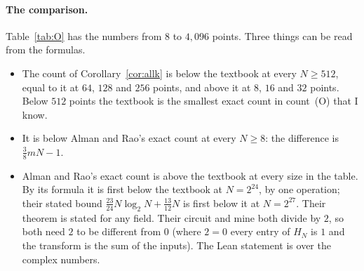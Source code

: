 \documentclass[10pt]{article}
\theoremstyle{remark}
\newcommand{\cntO}{\textup{(O)}}
\renewcommand{\lg}{\log_2}
\begin{document}
\paragraph{The comparison.}
Table~\ref{tab:O} has the numbers from $8$ to $4{,}096$ points. Three things can be read from the formulas.
\begin{itemize}\setlength{\itemsep}{1pt}\setlength{\parskip}{0pt}
\item The count of Corollary~\ref{cor:allk} is below the textbook at every $N\ge 512$, equal to it at
$64$, $128$ and $256$ points, and above it at $8$, $16$ and $32$ points. Below $512$ points the textbook is
the smallest exact count in count~\cntO{} that I know.
\item It is below Alman and Rao's exact count at every $N\ge 8$: the difference is $\tfrac38mN-1$.
\item Alman and Rao's exact count is above the textbook at every size in the table. By its formula it is
first below the textbook at $N=2^{24}$, by one operation; their stated bound
$\tfrac{23}{24}N\lg N+\tfrac{13}{12}N$ is first below it at $N=2^{27}$. Their theorem is stated for any field.
Their circuit and mine both divide by $2$, so both need $2$ to be different from $0$ (where $2=0$ every entry
of $H_N$ is $1$ and the transform is the sum of the inputs). The Lean statement is over the complex numbers.
\end{itemize}
\end{document}
